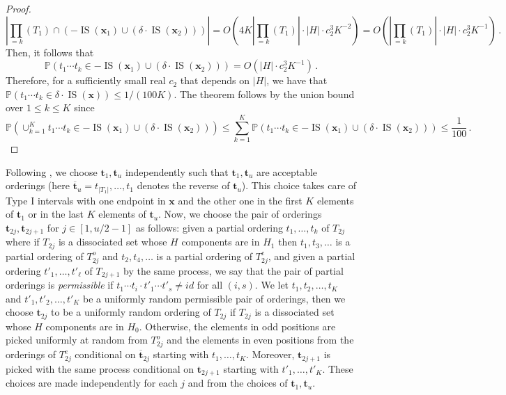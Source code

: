 \documentclass[11pt]{amsart}
\theoremstyle{definition}
\DeclareMathOperator{\IS}{IS}
\begin{document}
\begin{proof}
$$
    \left| \prod_{=k} (T_1) \cap \left(-\IS(\mathbf{x}_1) \cup \left(\delta \cdot \IS(\mathbf{x}_2)\right)\right) \right| = O\left( 4K \left| \prod_{=k} (T_1) \right| \cdot |H| \cdot c_2^3 K^{-2}  \right) = O\left(\left| \prod_{=k} (T_1)\right| \cdot |H| \cdot c_2^3 K^{-1} \right) \,.
$$
Then, it follows that
$$
    \mathbb{P}\left( t_1 \cdots t_k \in -\IS(\mathbf{x}_1) \cup \left(\delta \cdot \IS(\mathbf{x}_2)\right)\right) = O\left(|H| \cdot c_2^3 K^{-1} \right)\,.
$$
Therefore, for a sufficiently small real $c_2$ that depends on $|H|$, we have that $\mathbb{P}\left( t_1 \cdots t_k \in \delta \cdot \IS(\mathbf{x})\right) \leq 1/(100K)$. The theorem follows by the union bound over $1 \leq k \leq K$ since
$$
    \mathbb{P}\left(\cup_{k=1}^K t_1 \cdots t_k \in -\IS(\mathbf{x}_1) \cup \left(\delta \cdot \IS(\mathbf{x}_2)\right)\right) \leq \sum_{k=1}^K \mathbb{P}\left(t_1 \cdots t_k \in -\IS(\mathbf{x}_1) \cup \left(\delta \cdot \IS(\mathbf{x}_2)\right)\right) \leq \frac{1}{100}\,.
$$
\end{proof}

Following \cite{BK}, we choose $\mathbf{t}_1, \mathbf{t}_u$ independently such that $\mathbf{t}_1, \mathbf{t}_u$ are acceptable orderings (here $\overline{\mathbf{t}}_u = t_{|T_1|}, \ldots, t_1$ denotes the reverse of $\mathbf{t}_u$). This choice takes care of Type I intervals with one endpoint in $\mathbf{x}$ and the other one in the first $K$ elements of $\mathbf{t}_1$ or in the last $K$ elements of $\mathbf{t}_u$. Now, we choose the pair of orderings $\mathbf{t}_{2j}, \mathbf{t}_{2j+1}$ for $j \in [1, u/2-1]$ as follows: given a partial ordering $t_1, \ldots, t_k$ of $T_{2j}$ where if $T_{2j}$ is a dissociated set whose $H$ components are in $H_1$ then $t_1, t_3, \ldots$ is a partial ordering of $T_{2j}^o$ and $t_2, t_4, \ldots$ is a partial ordering of $T_{2j}^e$, and given a partial ordering $t'_1, \ldots, t'_{\ell}$ of $T_{2j+1}$ by the same process, we say that the pair of partial orderings is \emph{permissible} if $t_1 \cdots t_i \cdot t'_1 \cdots t'_s \neq id$ for all $(i,s)$. We let $t_1,t_2,\ldots, t_K$ and $t'_1, t'_2, \ldots, t'_K$ be a uniformly random permissible pair of orderings, then we choose $\mathbf{t}_{2j}$ to be a uniformly random ordering of $T_{2j}$ if $T_{2j}$ is a dissociated set whose $H$ components are in $H_0$. Otherwise, the elements in odd positions are picked uniformly at random from $T_{2j}^o$ and the elements in even positions from the orderings of $T_{2j}^e$ conditional on $\overline{\mathbf{t}}_{2j}$ starting with $t_1, \ldots, t_K$. Moreover, $\mathbf{t}_{2j+1}$ is picked with the same process conditional on $\mathbf{t}_{2j+1}$ starting with $t'_1, \ldots, t'_K$. These choices are made independently for each $j$ and from the choices of $\mathbf{t}_1, \mathbf{t}_u$.
\end{document}
